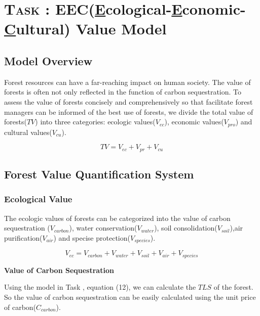 \section{\textsc {Task \uppercase\expandafter{}}: EEC(\underline{E}cological-\underline{E}conomic-\underline{C}ultural) Value Model}

\subsection{Model Overview}

Forest resources can have a far-reaching impact on human society. The value of forests is often not only reﬂected in the function of carbon sequestration. To assess the value of forests concisely and comprehensively so that facilitate forest managers can be informed of the best use of forests, we divide the total value of forests($TV$) into three categories: ecologic values($V_{ec}$), economic values($V_{pro}$) and cultural values($V_{cu}$).\cite{value1}\cite{value2} %


\begin{equation}
TV= V_{ec}+ V_{pr}+ V_{cu}
\end{equation}

\subsection{Forest Value Quantification System}
\subsubsection{Ecological Value}
The ecologic values of forests can be categorized into the value of carbon sequestration \qquad ($V_{carbon}$), water conservation($V_{water}$), soil consolidation($V_{soil}$),air purification($V_{air}$) and specise protection($V_{species}$).

\begin{equation}
V_{ec} = V_{carbon} + V_{water} + V_{soil} + V_{air}+V_{species}
\end{equation}

\textbf{Value of Carbon Sequestration}

Using the model in {Task \uppercase\expandafter{}}, equation (12), we can calculate the $TLS$ of the forest. So the value of carbon sequestration can be easily calculated using the unit price of carbon($C_{carbon}$).

